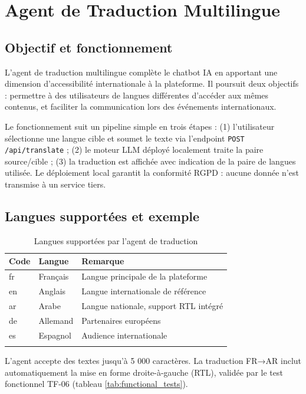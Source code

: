 \section{Agent de Traduction Multilingue}

\subsection{Objectif et fonctionnement}
L'agent de traduction multilingue complète le chatbot IA en apportant une dimension d'accessibilité internationale à la plateforme. Il poursuit deux objectifs : permettre à des utilisateurs de langues différentes d'accéder aux mêmes contenus, et faciliter la communication lors des événements internationaux.

Le fonctionnement suit un pipeline simple en trois étapes : (1) l'utilisateur sélectionne une langue cible et soumet le texte via l'endpoint \texttt{POST /api/translate} ; (2) le moteur LLM déployé localement traite la paire source/cible ; (3) la traduction est affichée avec indication de la paire de langues utilisée. Le déploiement local garantit la conformité RGPD : aucune donnée n'est transmise à un service tiers.

\subsection{Langues supportées et exemple}

\begin{longtable}{|m{2cm}|m{3.5cm}|m{7cm}|}
\hline
\textbf{Code} & \textbf{Langue} & \textbf{Remarque} \\
\hline
\endhead
\endfoot
\endlastfoot
\hline
fr & Français & Langue principale de la plateforme \\
\hline
en & Anglais & Langue internationale de référence \\
\hline
ar & Arabe & Langue nationale, support RTL intégré \\
\hline
de & Allemand & Partenaires européens \\
\hline
es & Espagnol & Audience internationale \\
\hline
\captionsetup{justification=centering,margin=2cm}
\caption{Langues supportées par l'agent de traduction}
\label{tab:languages}
\end{longtable}

L'agent accepte des textes jusqu'à 5 000 caractères. La traduction FR→AR inclut automatiquement la mise en forme droite-à-gauche (RTL), validée par le test fonctionnel TF-06 (tableau \ref{tab:functional_tests}).

